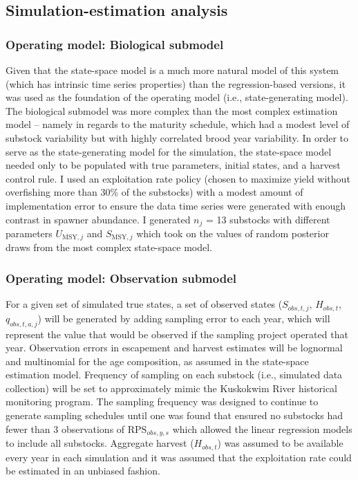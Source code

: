 \documentclass[12pt,]{book}
\theoremstyle{definition}
\theoremstyle{definition}
\theoremstyle{definition}
\theoremstyle{remark}
\begin{document}
\subsection{Simulation-estimation
analysis}\label{simulation-estimation-analysis}

\subsubsection{Operating model: Biological
submodel}\label{operating-model-biological-submodel}

\noindent
Given that the state-space model is a much more natural model of this
system (which has intrinsic time series properties) than the
regression-based versions, it was used as the foundation of the
operating model (i.e., state-generating model). The biological submodel
was more complex than the most complex estimation model -- namely in
regards to the maturity schedule, which had a modest level of substock
variability but with highly correlated brood year variability. In order
to serve as the state-generating model for the simulation, the
state-space model needed only to be populated with true parameters,
initial states, and a harvest control rule. I used an exploitation rate
policy (chosen to maximize yield without overfishing more than 30\% of
the substocks) with a modest amount of implementation error to ensure
the data time series were generated with enough contrast in spawner
abundance. I generated \(n_j\) = 13 substocks with different parameters
\(U_{\text{MSY},j}\) and \(S_{\text{MSY},j}\) which took on the values
of random posterior draws from the most complex state-space model.

\subsubsection{Operating model: Observation
submodel}\label{operating-model-observation-submodel}

For a given set of simulated true states, a set of observed states
(\(S_{obs,t,j}\), \(H_{obs,t}\), \(q_{obs,t,a,j}\)) will be generated by
adding sampling error to each year, which will represent the value that
would be observed if the sampling project operated that year.
Observation errors in escapement and harvest estimates will be lognormal
and multinomial for the age composition, as assumed in the state-space
estimation model. Frequency of sampling on each substock (i.e.,
simulated data collection) will be set to approximately mimic the
Kuskokwim River historical monitoring program. The sampling frequency
was designed to continue to generate sampling schedules until one was
found that ensured no substocks had fewer than 3 observations of
\(\text{RPS}_{obs,y,s}\) which allowed the linear regression models to
include all substocks. Aggregate harvest (\(H_{obs,t}\)) was assumed to
be available every year in each simulation and it was assumed that the
exploitation rate could be estimated in an unbiased fashion.
\end{document}
